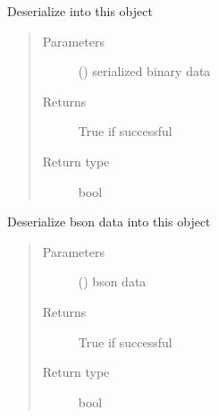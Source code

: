 \documentclass[letterpaper,10pt,english]{sphinxmanual}
\begin{document}
\begin{fulllineitems}
\begin{fulllineitems}
\begin{quote}
\begin{description}
\end{description}\end{quote}

\end{fulllineitems}


\begin{fulllineitems}
\label{\detokenize{bbc1.core.bbclib:bbc1.core.bbclib.BBcTransaction.deserialize}}
Deserialize into this object
\begin{quote}\begin{description}
\item[{Parameters}] \leavevmode
{} () \textendash{} serialized binary data

\item[{Returns}] \leavevmode
True if successful

\item[{Return type}] \leavevmode
bool

\end{description}\end{quote}

\end{fulllineitems}


\begin{fulllineitems}
\label{\detokenize{bbc1.core.bbclib:bbc1.core.bbclib.BBcTransaction.deserialize_bson}}
Deserialize bson data into this object
\begin{quote}\begin{description}
\item[{Parameters}] \leavevmode
{} () \textendash{} bson data

\item[{Returns}] \leavevmode
True if successful

\item[{Return type}] \leavevmode
bool

\end{description}\end{quote}


\end{fulllineitems}
\end{fulllineitems}
\end{document}
